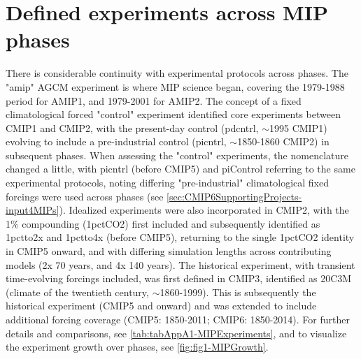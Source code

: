 \documentclass[manuscript]{copernicus}
\begin{document}


\appendix
\section{Defined experiments across MIP phases}  %
\label{sec:secAppA1-MIPExperiments}
There is considerable continuity with experimental protocols across phases. The "amip" AGCM experiment is where MIP science began, covering the 1979-1988 period for AMIP1, and 1979-2001 for AMIP2. The concept of a fixed climatological forced "control" experiment identified core experiments between CMIP1 and CMIP2, with the present-day control (pdcntrl, $\sim$1995 CMIP1) evolving to include a pre-industrial control (picntrl, $\sim$1850-1860 CMIP2) in subsequent phases. When assessing the "control" experiments, the nomenclature changed a little, with picntrl (before CMIP5) and piControl referring to the same experimental protocols, noting differing "pre-industrial" climatological fixed forcings were used across phases (see \autoref{sec:CMIP6SupportingProjects-input4MIPs}). Idealized experiments were also incorporated in CMIP2, with the 1\% compounding (1pctCO2) first included and subsequently identified as 1pctto2x and 1pctto4x (before CMIP5), returning to the single 1pctCO2 identity in CMIP5 onward, and with differing simulation lengths across contributing models (2x 70 years, and 4x 140 years). The historical experiment, with transient time-evolving forcings included, was first defined in CMIP3, identified as 20C3M (climate of the twentieth century, $\sim$1860-1999). This is subsequently the historical experiment (CMIP5 and onward) and was extended to include additional forcing coverage (CMIP5: 1850-2011; CMIP6: 1850-2014). For further details and comparisons, see \autoref{tab:tabAppA1-MIPExperiments}, and to visualize the experiment growth over phases, see \autoref{fig:fig1-MIPGrowth}.
\end{document}

